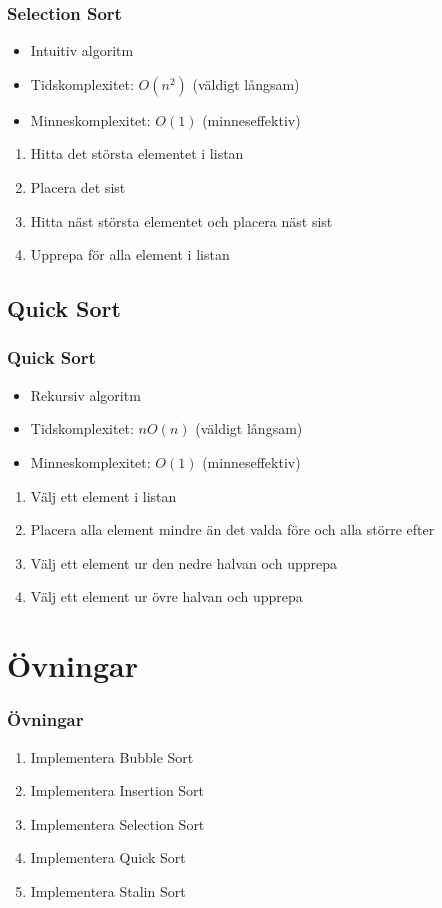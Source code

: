 \documentclass[aspectratio=169]{beamer}
\begin{document}
\begin{frame}
	\frametitle{Selection Sort}
	
	\begin{itemize}
		\item Intuitiv algoritm
		\item Tidskomplexitet: \(O(n^2)\) (väldigt långsam)
		\item Minneskomplexitet: \(O(1)\) (minneseffektiv)
	\end{itemize}
	
	\begin{enumerate}
		\item Hitta det största elementet i listan
		\item Placera det sist
		\item Hitta näst största elementet och placera näst sist
		\item Upprepa för alla element i listan
	\end{enumerate}

\end{frame}

\subsection{Quick Sort}

\begin{frame}
	\frametitle{Quick Sort}
	
	\begin{itemize}
		\item Rekursiv algoritm
		\item Tidskomplexitet: \(nO(n)\) (väldigt långsam)
		\item Minneskomplexitet: \(O(1)\) (minneseffektiv)
	\end{itemize}
	
	\begin{enumerate}
		\item Välj ett element i listan
		\item Placera alla element mindre än det valda före och alla större efter
		\item Välj ett element ur den nedre halvan och upprepa
		\item Välj ett element ur övre halvan och upprepa
	\end{enumerate}

\end{frame}

\section{Övningar}

\begin{frame}
	\frametitle{Övningar}
	
	\begin{enumerate}
		\item Implementera Bubble Sort
		\item Implementera Insertion Sort
		\item Implementera Selection Sort
		\item Implementera Quick Sort
		\item Implementera Stalin Sort
	\end{enumerate}

\end{frame}
\end{document}
